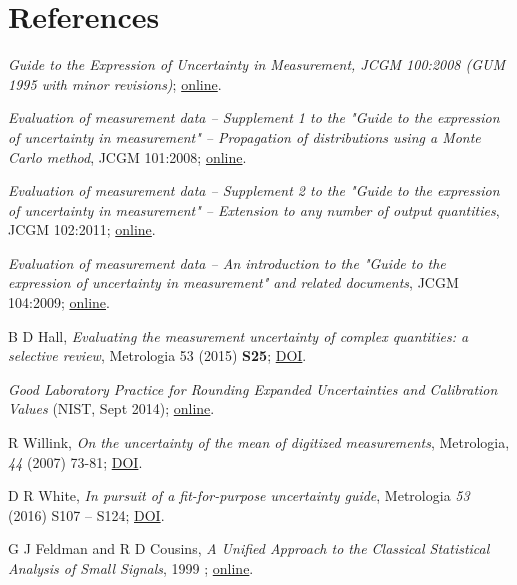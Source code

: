 \section{References}

\begingroup
\renewcommand{\section}[2]{}%

\begin{thebibliography}{99}
 \textit{Guide to the Expression of Uncertainty in Measurement, JCGM 100:2008 (GUM 1995 with minor revisions)}; \href{http://www.bipm.org/utils/common/documents/jcgm/JCGM_100_2008_E.pdf}{online}.

 \textit{Evaluation of measurement data – Supplement 1 to the "Guide to the expression of uncertainty in measurement" – Propagation of distributions using a Monte Carlo method}, JCGM 101:2008; \href{http://www.bipm.org/utils/common/documents/jcgm/JCGM_101_2008_E.pdf}{online}.
 
 \textit{Evaluation of measurement data – Supplement 2 to the "Guide to the expression of uncertainty in measurement" – Extension to any number of output quantities}, JCGM 102:2011; \href{http://www.bipm.org/utils/common/documents/jcgm/JCGM_102_2011_E.pdf}{online}.

 \textit{Evaluation of measurement data – An introduction to the "Guide to the expression of uncertainty in measurement" and related documents}, JCGM 104:2009; \href{http://www.bipm.org/utils/common/documents/jcgm/JCGM_104_2009_E.pdf}{online}.

B D Hall, \textit{Evaluating the measurement uncertainty of complex quantities: a selective review}, Metrologia 53 (2015) \textbf{S25}; \href{http://dx.doi.org/10.1088/0026-1394/53/1/S25}{DOI}.

\textit{Good Laboratory Practice for Rounding Expanded Uncertainties and Calibration Values} (NIST, Sept 2014); \href{http://www.nist.gov/pml/wmd/labmetrology/upload/GLP_9_20140911.pdf}{online}. 

R Willink, \textit{On the uncertainty of the mean of digitized measurements}, Metrologia, \textit{44} (2007) 73-81; \href{http://dx.doi.org/10.1088/0026-1394/44/1/011}{DOI}.

D R White, \textit{In pursuit of a fit-for-purpose uncertainty guide}, Metrologia \textit{53} (2016) S107 – S124; \href{http://dx.doi.org/10.1088/0026-1394/53/4/S107}{DOI}.

G J Feldman and R D Cousins, \textit{A Unified Approach to the Classical Statistical Analysis of Small Signals}, 1999 ; \href{http://arxiv.org/abs/physics/9711021/}{online}.

\end{thebibliography}
\endgroup